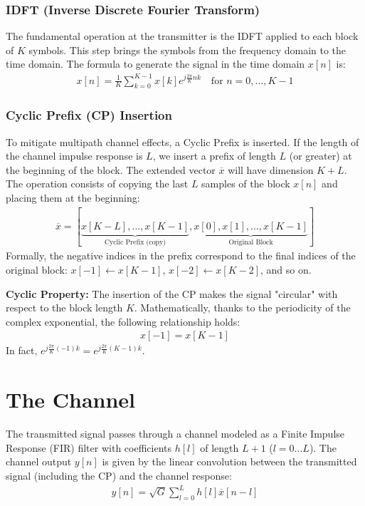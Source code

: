 \documentclass[a4paper, 12pt]{book}
\begin{document}
\subsubsection{IDFT (Inverse Discrete Fourier Transform)}
The fundamental operation at the transmitter is the IDFT applied to each block of $K$ symbols. This step brings the symbols from the frequency domain to the time domain.
The formula to generate the signal in the time domain $x[n]$ is:
\begin{align}
x[n] = \frac{1}{K} \sum_{k=0}^{K-1} x[k] e^{j \frac{2\pi}{K} nk} \quad \text{for } n=0, \dots, K-1
\end{align}

\subsubsection{Cyclic Prefix (CP) Insertion}
To mitigate multipath channel effects, a Cyclic Prefix is inserted. If the length of the channel impulse response is $L$, we insert a prefix of length $L$ (or greater) at the beginning of the block.
The extended vector $\overline{x}$ will have dimension $K+L$. The operation consists of copying the last $L$ samples of the block $x[n]$ and placing them at the beginning:
\begin{align}
\overline{x} = [\underbrace{x[K-L], \dots, x[K-1]}_{\text{Cyclic Prefix (copy)}}, \underbrace{x[0], x[1], \dots, x[K-1]}_{\text{Original Block}}]
\end{align}
Formally, the negative indices in the prefix correspond to the final indices of the original block: $x[-1] \leftarrow x[K-1]$, $x[-2] \leftarrow x[K-2]$, and so on.

\textbf{Cyclic Property:}
The insertion of the CP makes the signal "circular" with respect to the block length $K$. Mathematically, thanks to the periodicity of the complex exponential, the following relationship holds:
\begin{align}
x[-1] = x[K-1]
\end{align}
In fact, $e^{j\frac{2\pi}{K}(-1)k} = e^{j\frac{2\pi}{K}(K-1)k}$.

\section{The Channel}

The transmitted signal passes through a channel modeled as a Finite Impulse Response (FIR) filter with coefficients $h[l]$ of length $L+1$ ($l=0 \dots L$).
The channel output $y[n]$ is given by the linear convolution between the transmitted signal (including the CP) and the channel response:
\begin{align}
y[n] = \sqrt{G} \sum_{l=0}^{L} h[l] \overline{x}[n-l]
\end{align}
\end{document}

